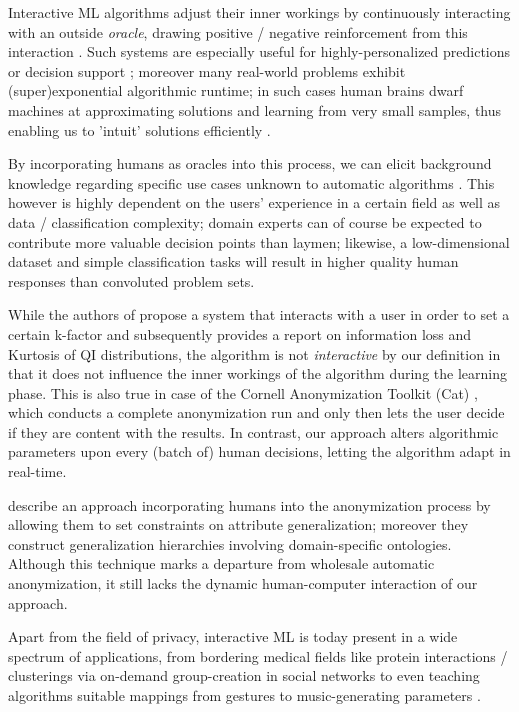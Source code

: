 \documentclass{llncs}
\begin{document}
Interactive ML algorithms adjust their inner workings by continuously interacting with an outside \textit{oracle}, drawing positive / negative reinforcement from this interaction \cite{Holzinger:2016:iML}. Such systems are especially useful for highly-personalized predictions or decision support \cite{Kieseberg:2016:Doctor-in-the-Loop}; moreover many real-world problems exhibit (super)exponential algorithmic runtime; in such cases human brains dwarf machines at approximating solutions and learning from very small samples, thus enabling us to 'intuit' solutions efficiently \cite{iMLExperiment}.

By incorporating humans as oracles into this process, we can elicit background knowledge regarding specific use cases unknown to automatic algorithms \cite{WARE2001}. This however is highly dependent on the users' experience in a certain field as well as data / classification complexity; domain experts can of course be expected to contribute more valuable decision points than laymen; likewise, a low-dimensional dataset and simple classification tasks will result in higher quality human responses than convoluted problem sets.

While the authors of \cite{Moque2012} propose a system that interacts with a user in order to set a certain k-factor and subsequently provides a report on information loss and Kurtosis of QI distributions, the algorithm is not \textit{interactive} by our definition in that it does not influence the inner workings of the algorithm during the learning phase. This is also true in case of the Cornell Anonymization Toolkit (Cat) \cite{Xiao2009}, which conducts a complete anonymization run and only then lets the user decide if they are content with the results. In contrast, our approach alters algorithmic parameters upon every (batch of) human decisions, letting the algorithm adapt in real-time.

\cite{Loh2010} describe an approach incorporating humans into the anonymization process by allowing them to set constraints on attribute generalization; moreover they construct generalization hierarchies involving domain-specific ontologies. Although this technique marks a departure from wholesale automatic anonymization, it still lacks the dynamic human-computer interaction of our approach.

Apart from the field of privacy, interactive ML is today present in a wide spectrum of applications, from bordering medical fields like protein interactions / clusterings \cite{Amershi2014} via on-demand group-creation in social networks \cite{Amershi2012} to even teaching algorithms suitable mappings from gestures to music-generating parameters \cite{Fiebrink2009}.
\end{document}
